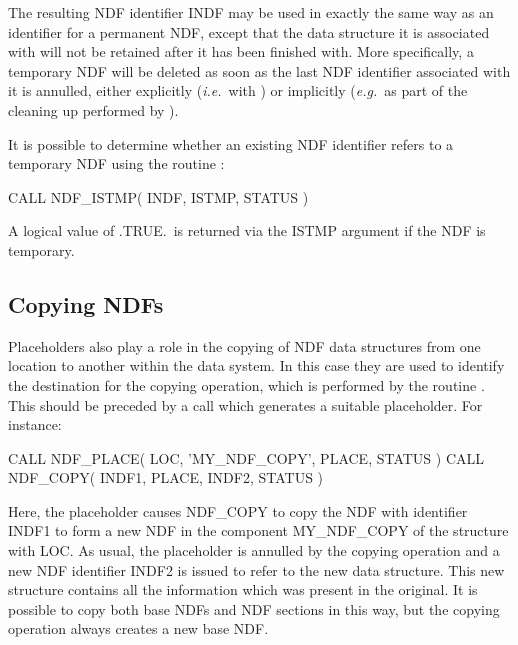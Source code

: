 \documentclass[twoside,11pt,nolof]{starlink}
\providecommand{\st}[1]{{\emph{#1}}}
\begin{document}
The resulting NDF identifier INDF may be used in exactly the same way as an
identifier for a permanent NDF, except that the data structure it is
associated with will not be retained after it has been finished with.
More specifically, a temporary NDF will be deleted as soon as the last NDF
identifier associated with it is annulled, either explicitly (\st{i.e.}\ with
) or implicitly (\st{e.g.}\ as part of the cleaning up performed by
).

It is possible to determine whether an existing NDF identifier refers to a
temporary NDF using the routine :

\small
\begin{terminalv}
      CALL NDF_ISTMP( INDF, ISTMP, STATUS )
\end{terminalv}
\normalsize

A logical value of .TRUE.\ is returned via the ISTMP argument if the NDF is
temporary.

\subsection{Copying NDFs}

Placeholders also play a role in the copying of NDF data structures from one
location to another within the data system.
In this case they are used to identify the destination for the copying
operation, which is performed by the routine .
This should be preceded by a call which generates a suitable placeholder.
For instance:

\small
\begin{terminalv}
      CALL NDF_PLACE( LOC, 'MY_NDF_COPY', PLACE, STATUS )
      CALL NDF_COPY( INDF1, PLACE, INDF2, STATUS )
\end{terminalv}
\normalsize

Here, the placeholder causes NDF\_COPY to copy the NDF with identifier
INDF1 to form a new NDF in the component MY\_NDF\_COPY of the
 structure with
 LOC.
As usual, the placeholder is annulled by the copying operation and a new NDF
identifier INDF2 is issued to refer to the new data structure.
This new structure contains all the information which was present in the
original.
It is possible to copy both base NDFs and NDF sections in this way, but the
copying operation always creates a new base NDF.
\end{document}
